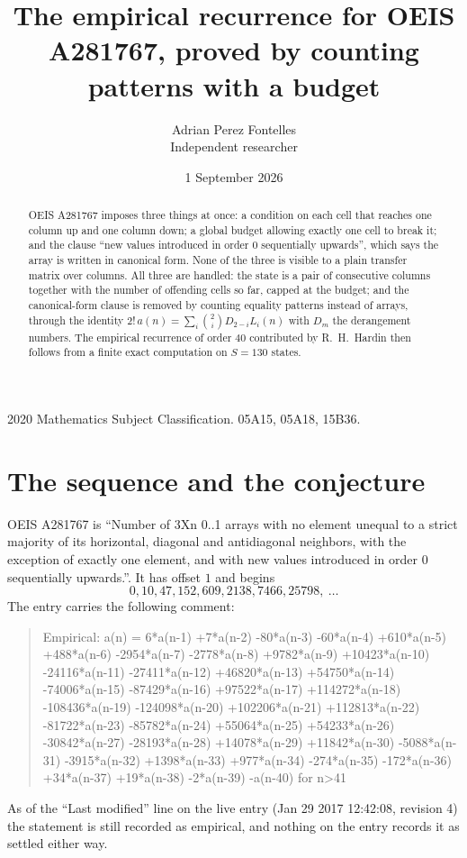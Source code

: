 \documentclass[11pt,a4paper]{article}
\title{The empirical recurrence for OEIS A281767, proved by counting patterns with a budget}
\author{Adrian Perez Fontelles\\ \small Independent researcher}
\date{1 September 2026}
\theoremstyle{plain}
\theoremstyle{definition}
\begin{document}
\maketitle

\begin{abstract}
OEIS A281767 imposes three things at once: a condition on each cell that reaches one column up and
one column down; a global budget allowing exactly one cell to
break it; and the clause ``new values introduced in order $0$ sequentially upwards'', which
says the array is written in canonical form. None of the three is visible to a plain transfer
matrix over columns. All three are handled: the state is a pair of consecutive columns
together with the number of offending cells so far, capped at the budget; and the
canonical-form clause is removed by counting equality patterns instead of arrays, through the
identity $2!\,a(n)=\sum_i\binom{2}{i}D_{2-i}L_i(n)$ with $D_m$ the derangement
numbers. The empirical recurrence of order $40$ contributed by R.~H.~Hardin then follows
from a finite exact computation on $S=130$ states.
\end{abstract}

\noindent\small 2020 Mathematics Subject Classification. 05A15, 05A18, 15B36.\normalsize

\section{The sequence and the conjecture}

OEIS A281767 is ``Number of 3Xn 0..1 arrays with no element unequal to a strict majority of its horizontal, diagonal and antidiagonal neighbors, with the exception of exactly one element, and with new values introduced in order 0 sequentially upwards.''. It has offset $1$ and begins
\[
0, 10, 47, 152, 609, 2138, 7466, 25798,\ \dots
\]
The entry carries the following comment:
\begin{quote}\small
Empirical: a(n) = 6*a(n-1) +7*a(n-2) -80*a(n-3) -60*a(n-4) +610*a(n-5) +488*a(n-6) -2954*a(n-7) -2778*a(n-8) +9782*a(n-9) +10423*a(n-10) -24116*a(n-11) -27411*a(n-12) +46820*a(n-13) +54750*a(n-14) -74006*a(n-15) -87429*a(n-16) +97522*a(n-17) +114272*a(n-18) -108436*a(n-19) -124098*a(n-20) +102206*a(n-21) +112813*a(n-22) -81722*a(n-23) -85782*a(n-24) +55064*a(n-25) +54233*a(n-26) -30842*a(n-27) -28193*a(n-28) +14078*a(n-29) +11842*a(n-30) -5088*a(n-31) -3915*a(n-32) +1398*a(n-33) +977*a(n-34) -274*a(n-35) -172*a(n-36) +34*a(n-37) +19*a(n-38) -2*a(n-39) -a(n-40) for n>41
\end{quote}
As of the ``Last modified'' line on the live entry (Jan 29 2017 12:42:08, revision 4) the statement is
still recorded as empirical, and nothing on the entry records it as settled either way.
\end{document}

